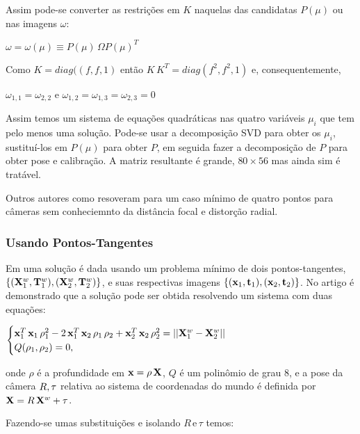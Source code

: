 Assim pode-se converter as restrições em $K$ naquelas das candidatas $P(\mu)$ ou nas imagens $\omega$:

\begin{center}
$\omega  = \omega (\mu) \equiv P(\mu)\,\Omega P(\mu)^T$
\end{center}  

Como $K = diag((f,f,1)$ então $K\,K^T = diag(f^2,f^2,1)$ e, consequentemente, 
\begin{center}
$\omega _{1,1} = \omega_{2,2}$ \quad e \quad $\omega_{1,2} = \omega_{1,3} = \omega_{2,3} = 0$
\end{center}

Assim temos um sistema de equações quadráticas nas quatro variáveis $\mu_i$ que tem pelo menos uma solução. Pode-se usar a decomposição SVD para obter os $\mu_i$, sustituí-los em $P(\mu)$ para obter $P$, em seguida fazer a decomposição de $P$ para obter pose e calibração. A matriz resultante é grande, $80\times 56$ mas ainda sim é tratável.


 Outros autores como \cite{bujnak} resoveram para um caso mínimo de quatro pontos para câmeras sem conheciemnto da distância focal e distorção radial.

\subsubsection{Usando Pontos-Tangentes}
Em \cite{Fabbri:Giblin:Kimia:ECCV12} uma solução é dada usando um problema mínimo de dois pontos-tangentes,$\lbrace ({\bf X}_1^w,{\bf T}_1^w),({\bf X}_2^w,{\bf T}_2^w)\rbrace$, e suas respectivas imagens $\lbrace ({\bf x}_1,{\bf t}_1),({\bf x}_2,{\bf t}_2)\rbrace$. No artigo é demonstrado que a solução pode ser obtida resolvendo um sistema com duas equações:

\begin{center}
$\begin{cases}
{\bf x}_1^T\,{\bf x}_1\,\rho_1^2 - 2\,{\bf x}_1^T\,{\bf x}_2\,\rho_1\,\rho_2 + {\bf x}_2^T\,{\bf x}_2\,\rho_2^2 = ||{\bf X}_1^w - {\bf X}_2^w||\\
Q(\rho_1,\rho_2) = 0,
\end{cases}$
\end{center}

onde $\rho$ é a profundidade em ${\bf x} = \rho\,{\bf X}$, $Q$ é um polinômio de grau 8, e a pose da câmera $R, {\bf \tau}$ relativa ao sistema de coordenadas do mundo é definida por ${\bf X} = R\,{\bf X}^w  + \tau$. 

Fazendo-se umas substituições e isolando $R\, \text{e}\, \tau$ temos:

